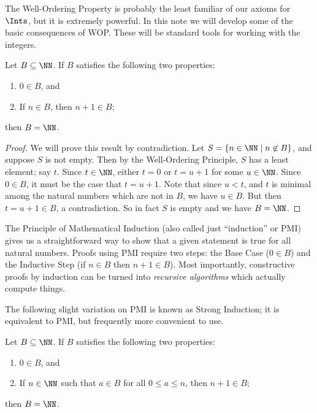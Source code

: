 \documentclass{article}
\begin{document}

The Well-Ordering Property is probably the least familiar of our axioms for $\Ints$, but it is extremely powerful. In this note we will develop some of the basic consequences of WOP. These will be standard tools for working with the integers.

\begin{thm}
Let $B \subseteq \NN$. If $B$ satisfies the following two properties:
\begin{enumerate}
\item $0 \in B$, and
\item If $n \in B$, then $n+1 \in B$;
\end{enumerate}
then $B = \NN$.
\end{thm}

\begin{proof}
We will prove this result by contradiction. Let $S = \{ n \in \NN \mid n \not\in B \}$, and suppose $S$ is not empty. Then by the Well-Ordering Principle, $S$ has a least element; say $t$. Since $t \in \NN$, either $t = 0$ or $t = u+1$ for some $u \in \NN$. Since $0 \in B$, it must be the case that $t = u+1$. Note that since $u < t$, and $t$ is minimal among the natural numbers which are not in $B$, we have $u \in B$. But then $t = u+1 \in B$, a contradiction. So in fact $S$ is empty and we have $B = \NN$.
\end{proof}

The Principle of Mathematical Induction (also called just ``induction'' or PMI) gives us a straightforward way to show that a given statement is true for all natural numbers. Proofs using PMI require two steps: the Base Case ($0 \in B$) and the Inductive Step (if $n \in B$ then $n+1 \in B$). Most importantly, constructive proofs by induction can be turned into \emph{recursive algorithms} which actually compute things.

The following slight variation on PMI is known as Strong Induction; it is equivalent to PMI, but frequently more convenient to use.

\begin{cor}
Let $B \subseteq \NN$. If $B$ satisfies the following two properties:
\begin{enumerate}
\item $0 \in B$, and
\item If $n \in \NN$ such that $a \in B$ for all $0 \leq a \leq n$, then $n+1 \in B$;
\end{enumerate}
then $B = \NN$.
\end{cor}
\end{document}
